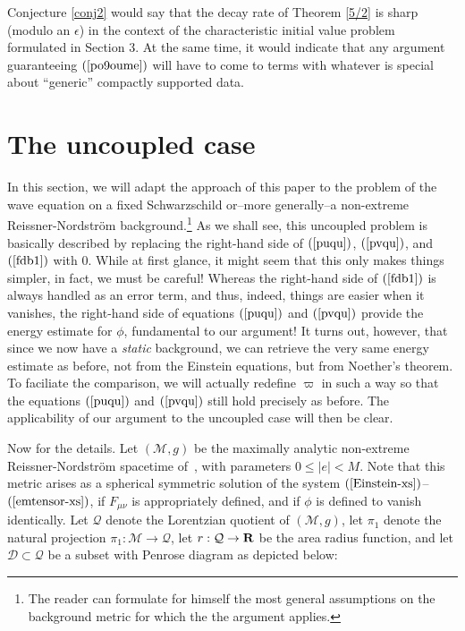 \documentclass{article}
\begin{document}
Conjecture \ref{conj2} would say that 
the decay rate of Theorem \ref{5/2} is sharp (modulo an
$\epsilon$) in the context of the characteristic initial value problem
formulated in Section 3. At the same time, it would
indicate that any argument guaranteeing $(\ref{po9oume})$ will have
to come to terms with whatever is special about ``generic''
compactly supported data. 

\section{The uncoupled case}
\label{uncoupledsec}
In this section, we will adapt the approach of this paper
to the problem of the wave equation on a fixed
Schwarzschild or--more generally--a non-extreme
Reissner-Nordstr\"om background.\footnote{The reader can formulate 
for himself the most general assumptions
on the background metric for which the the argument applies.}
As we shall see, this uncoupled problem is basically described by
replacing the right-hand side of $(\ref{puqu})$, $(\ref{pvqu})$, and 
$(\ref{fdb1})$
with $0$. While at first glance, 
it might seem that this only makes things simpler,
in fact, 
we must be careful! Whereas the right-hand side
of $(\ref{fdb1})$ is always handled as an error term,
and thus, indeed, things are easier when it vanishes,
the right-hand side of equations $(\ref{puqu})$ and $(\ref{pvqu})$ 
provide the energy estimate for $\phi$, fundamental to our
argument! It turns out, however,
that since we now have a \emph{static} background, we can retrieve the
very same energy estimate as before, not
from the Einstein equations, but from Noether's theorem.
To faciliate the comparison, we will actually
redefine $\varpi$ in such a way so that
the equations $(\ref{puqu})$ and $(\ref{pvqu})$ still hold precisely as before.
The applicability of our argument to the uncoupled case will then be clear.

Now for the details.
Let $(\mathcal{M},g)$ be the 
maximally analytic non-extreme Reissner-Nordstr\"om
spacetime of~\cite{he:lssst}, with parameters $0\le |e|< M$. Note that this 
metric arises as a spherical
symmetric solution of 
the system $(\ref{Einstein-xs})$--$(\ref{emtensor-xs})$, 
if $F_{\mu\nu}$ is appropriately
defined, and if 
$\phi$ is defined to vanish identically. Let $\mathcal{Q}$ denote
the Lorentzian quotient of $(\mathcal{M},g)$,
let $\pi_1$ denote the natural projection $\pi_1:\mathcal{M}\to\mathcal{Q}$, 
let $r:\mathcal{Q}\to{\bf R}$ be the area radius function,
and let $\mathcal{D}\subset\mathcal{Q}$
be a subset with Penrose diagram as depicted below:
\[

\]
\end{document}
